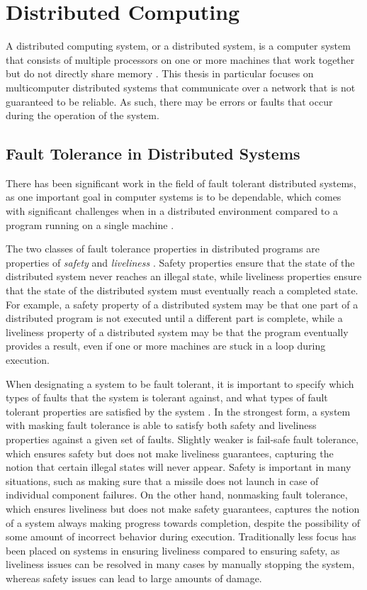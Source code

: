 \documentclass[oneside]{report}
\begin{document}
\section{Distributed Computing}

A distributed computing system, or a distributed system, is a computer system that consists of multiple processors on one or more machines that work together but do not directly share memory \cite{10.1145/72551.72552}.
This thesis in particular focuses on multicomputer distributed systems that communicate over a network that is not guaranteed to be reliable.
As such, there may be errors or faults that occur during the operation of the system.

\subsection{Fault Tolerance in Distributed Systems}
There has been significant work in the field of fault tolerant distributed systems, as one important goal in computer systems is to be dependable, which comes with significant challenges when in a distributed environment compared to a program running on a single machine \cite{10.1145/311531.311532}.

The two classes of fault tolerance properties in distributed programs are properties of \textit{safety} and \textit{liveliness} \cite{1702415}.
Safety properties ensure that the state of the distributed system never reaches an illegal state, while liveliness properties ensure that the state of the distributed system must eventually reach a completed state.
For example, a safety property of a distributed system may be that one part of a distributed program is not executed until a different part is complete, while a liveliness property of a distributed system may be that the program eventually provides a result, even if one or more machines are stuck in a loop during execution.

When designating a system to be fault tolerant, it is important to specify which types of faults that the system is tolerant against, and what types of fault tolerant properties are satisfied by the system \cite{10.1145/311531.311532}.
In the strongest form, a system with masking fault tolerance is able to satisfy both safety and liveliness properties against a given set of faults.
Slightly weaker is fail-safe fault tolerance, which ensures safety but does not make liveliness guarantees, capturing the notion that certain illegal states will never appear.
Safety is important in many situations, such as making sure that a missile does not launch in case of individual component failures.
On the other hand, nonmasking fault tolerance, which ensures liveliness but does not make safety guarantees, captures the notion of a system always making progress towards completion, despite the possibility of some amount of incorrect behavior during execution.
Traditionally less focus has been placed on systems in ensuring liveliness compared to ensuring safety, as liveliness issues can be resolved in many cases by manually stopping the system, whereas safety issues can lead to large amounts of damage.
\end{document}
